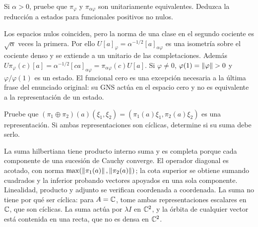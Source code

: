 \begin{ejercicio}\label{ej:v3-l29-1}
Si $\alpha>0$, pruebe que $\pi_\varphi$ y $\pi_{\alpha\varphi}$ son unitariamente equivalentes. Deduzca la reducción a estados para funcionales positivos no nulos.
\end{ejercicio}
\begin{solucion}
Los espacios nulos coinciden, pero la norma de una clase en el segundo cociente es $\sqrt\alpha$ veces la primera. Por ello $U[a]_\varphi=\alpha^{-1/2}[a]_{\alpha\varphi}$ es una isometría sobre el cociente denso y se extiende a un unitario de las completaciones. Además $U\pi_\varphi(c)[a]=\alpha^{-1/2}[ca]_{\alpha\varphi}=\pi_{\alpha\varphi}(c)U[a]$. Si $\varphi\ne0$, $\varphi(1)=\left\lVert\varphi\right\rVert>0$ y $\varphi/\varphi(1)$ es un estado. El funcional cero es una excepción necesaria a la última frase del enunciado original: su GNS actúa en el espacio cero y no es equivalente a la representación de un estado.
\end{solucion}

\begin{ejercicio}\label{ej:v3-l29-2}
Pruebe que $(\pi_1\oplus\pi_2)(a)(\xi_1,\xi_2)=(\pi_1(a)\xi_1,\pi_2(a)\xi_2)$ es una representación. Si ambas representaciones son cíclicas, determine si su suma debe serlo.
\end{ejercicio}
\begin{solucion}
La suma hilbertiana tiene producto interno suma y es completa porque cada componente de una sucesión de Cauchy converge. El operador diagonal es acotado, con norma $\max(\left\lVert\pi_1(a)\right\rVert,\left\lVert\pi_2(a)\right\rVert)$; la cota superior se obtiene sumando cuadrados y la inferior probando vectores apoyados en una sola componente. Linealidad, producto y adjunto se verifican coordenada a coordenada. La suma no tiene por qué ser cíclica: para $A=\mathbb C$, tome ambas representaciones escalares en $\mathbb C$, que son cíclicas. La suma actúa por $\lambda I$ en $\mathbb C^2$, y la órbita de cualquier vector está contenida en una recta, que no es densa en $\mathbb C^2$.
\end{solucion}

